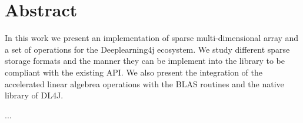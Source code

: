 

\cleardoublepage
\chapter*{Abstract}
In this work we present an implementation of sparse multi-dimensional array and a set of operations for the Deeplearning4j ecosystem. We study different sparse storage formats and the manner they can be implement into the library to be compliant with the existing API. We also present the integration of the accelerated linear algebrea operations with the BLAS routines and the native library of DL4J.

...

\vskip0.5cm




